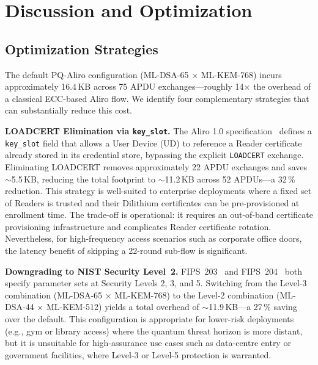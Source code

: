 \section{Discussion and Optimization}
\label{sec:discussion}

\subsection{Optimization Strategies}
\label{subsec:optimization}

The default PQ-Aliro configuration (ML-DSA-65 $\times$ ML-KEM-768) incurs approximately 16.4\,KB across 75 APDU exchanges---roughly 14$\times$ the overhead of a classical ECC-based Aliro flow. We identify four complementary strategies that can substantially reduce this cost.

\textbf{LOADCERT Elimination via \texttt{key\_slot}.}
The Aliro 1.0 specification~\cite{CSA:Aliro10} defines a \texttt{key\_slot} field that allows a User Device (UD) to reference a Reader certificate already stored in its credential store, bypassing the explicit \texttt{LOADCERT} exchange. Eliminating LOADCERT removes approximately 22 APDU exchanges and saves $\sim$5.5\,KB, reducing the total footprint to $\sim$11.2\,KB across 52 APDUs---a 32\,\% reduction. This strategy is well-suited to enterprise deployments where a fixed set of Readers is trusted and their Dilithium certificates can be pre-provisioned at enrollment time. The trade-off is operational: it requires an out-of-band certificate provisioning infrastructure and complicates Reader certificate rotation. Nevertheless, for high-frequency access scenarios such as corporate office doors, the latency benefit of skipping a 22-round sub-flow is significant.

\textbf{Downgrading to NIST Security Level~2.}
FIPS~203~\cite{NIST:FIPS203} and FIPS~204~\cite{NIST:FIPS204} both specify parameter sets at Security Levels 2, 3, and 5. Switching from the Level-3 combination (ML-DSA-65 $\times$ ML-KEM-768) to the Level-2 combination (ML-DSA-44 $\times$ ML-KEM-512) yields a total overhead of $\sim$11.9\,KB---a 27\,\% saving over the default. This configuration is appropriate for lower-risk deployments (e.g., gym or library access) where the quantum threat horizon is more distant, but it is unsuitable for high-assurance use cases such as data-centre entry or government facilities, where Level-3 or Level-5 protection is warranted.


